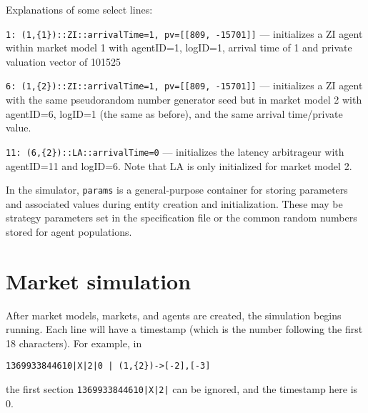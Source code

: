 \documentclass[11pt]{article}
\begin{document}
Explanations of some select lines:
\begin{description}
\item \verb|1: (1,{1})::ZI::arrivalTime=1, pv=[[809, -15701]]| --- initializes a ZI agent within market model 1 with agentID=1, logID=1, arrival time of 1 and private valuation vector of 101525

\item \verb|6: (1,{2})::ZI::arrivalTime=1, pv=[[809, -15701]]| --- initializes a ZI agent with the same pseudorandom number generator seed but in market model 2 with agentID=6, logID=1 (the same as before), and the same arrival time/private value.

\item \verb|11: (6,{2})::LA::arrivalTime=0| --- initializes the latency arbitrageur with agentID=11 and logID=6. Note that LA is only initialized for market model 2.
\end{description}

In the simulator, \verb|params| is a general-purpose container for storing parameters and associated values during entity creation and initialization. These may be strategy parameters set in the specification file or the common random numbers stored for agent populations.


\section{Market simulation}

After market models, markets, and agents are created, the simulation begins running.
Each line will have a timestamp (which is the number following the first 18 characters).
For example, in 
\begin{verbatim}
1369933844610|X|2|0 | (1,{2})->[-2],[-3]
\end{verbatim}
the first section \verb+1369933844610|X|2|+ can be ignored, and the timestamp here is 0.
\end{document}
